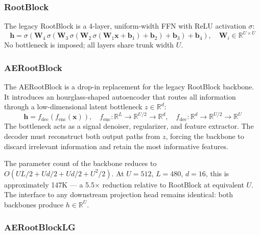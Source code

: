 \documentclass{article}
\begin{document}
\subsubsection{RootBlock}

The legacy RootBlock is a 4-layer, uniform-width FFN with ReLU activation $\sigma$:
\begin{equation*}
\mathbf{h} = \sigma\!\left(\mathbf{W}_4\,\sigma\!\left(\mathbf{W}_3\,\sigma\!\left(\mathbf{W}_2\,\sigma(\mathbf{W}_1\mathbf{x}+\mathbf{b}_1)+\mathbf{b}_2\right)+\mathbf{b}_3\right)+\mathbf{b}_4\right), \quad \mathbf{W}_i \in \mathbb{R}^{U\times U}
\end{equation*}
No bottleneck is imposed; all layers share trunk width $U$.

\subsubsection{AERootBlock}

The AERootBlock is a drop-in replacement for the legacy RootBlock backbone. It introduces an hourglass-shaped autoencoder that routes all information through a low-dimensional latent bottleneck $z \in \mathbb{R}^{d}$:
\begin{equation*}
\mathbf{h} = f_{\mathrm{dec}}(f_{\mathrm{enc}}(\mathbf{x})), \quad f_{\mathrm{enc}}: \mathbb{R}^L \!\to\! \mathbb{R}^{U/2} \!\to\! \mathbb{R}^{d}, \quad f_{\mathrm{dec}}: \mathbb{R}^{d} \!\to\! \mathbb{R}^{U/2} \!\to\! \mathbb{R}^U
\end{equation*}
The bottleneck acts as a signal denoiser, regularizer, and feature extractor. The decoder must reconstruct both output paths from $z$, forcing the backbone to discard irrelevant information and retain the most informative features.

The parameter count of the backbone reduces to $O(UL/2 + Ud/2 + Ud/2 + U^2/2)$. At $U = 512$, $L = 480$, $d = 16$, this is approximately 147K --- a 5.5$\times$ reduction relative to RootBlock at equivalent $U$. The interface to any downstream projection head remains identical: both backbones produce $h \in \mathbb{R}^U$.

\subsubsection{AERootBlockLG}
\end{document}
